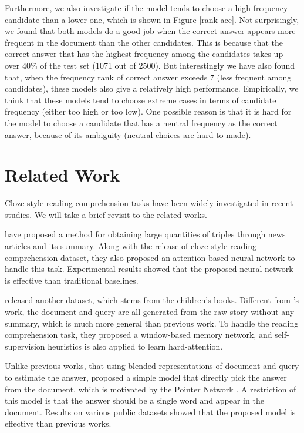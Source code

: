 \documentclass[11pt,a4paper]{article}
\begin{document}
Furthermore, we also investigate if the model tends to choose a high-frequency candidate than a lower one, which is shown in Figure \ref{rank-acc}. 
Not surprisingly, we found that both models do a good job when the correct answer appears more frequent in the document than the other candidates.
This is because that the correct answer that has the highest frequency among the candidates takes up over 40\% of the test set (1071 out of 2500).
But interestingly we have also found that, when the frequency rank of correct answer exceeds 7 (less frequent among candidates), these models also give a relatively high performance.
Empirically, we think that these models tend to choose extreme cases in terms of candidate frequency (either too high or too low).
One possible reason is that it is hard for the model to choose a candidate that has a neutral frequency as the correct answer, because of its ambiguity (neutral choices are hard to made). 


\section{Related Work}\label{related-work}

Cloze-style reading comprehension tasks have been widely investigated in recent studies. 
We will take a brief revisit to the related works.

 have proposed a method for obtaining large quantities of  triples through news articles and its summary. Along with the release of cloze-style reading comprehension dataset, they also proposed an attention-based neural network to handle this task. Experimental results showed that the proposed neural network is effective than traditional baselines.

 released another dataset, which stems from the children's books. Different from 's work, the document and query are all generated from the raw story without any summary, which is much more general than previous work. To handle the reading comprehension task, they proposed a window-based memory network, and self-supervision heuristics is also applied to learn hard-attention. 

Unlike previous works, that using blended representations of document and query to estimate the answer,  proposed a simple model that directly pick the answer from the document, which is motivated by the Pointer Network \cite{vinyals-etal-2015}. A restriction of this model is that the answer should be a single word and appear in the document. Results on various public datasets showed that the proposed model is effective than previous works.
\end{document}

